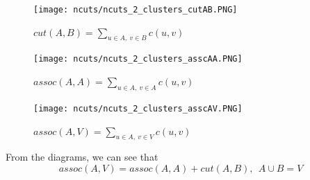 \documentclass[a4paper]{article}
\begin{document}
\begin{multicols}{3}

\begin{figure}[H]
	\centering %
	\texttt{[image: ncuts/ncuts\_2\_clusters\_cutAB.PNG]}
    \caption{$cut(A,B) = \sum\limits_{u\in A,\ v\in B}{c\left( u,v \right)}$}
\end{figure}
\columnbreak

\begin{figure}[H]
	\centering %
    	\texttt{[image: ncuts/ncuts\_2\_clusters\_asscAA.PNG]}
    \caption{$assoc(A,A)= \sum\limits_{u\in A,\ v \in A}{c(u,v)}$}
\end{figure}
\columnbreak

\begin{figure}[H]
	\centering %
    	\texttt{[image: ncuts/ncuts\_2\_clusters\_asscAV.PNG]}
    \caption{$assoc(A,V)= \sum\limits_{u\in A,\ v \in V}{c(u,v)}$}
\end{figure}
\end{multicols}
From the diagrams, we can see that
\begin{equation}
    assoc(A,V) = assoc(A,A) + cut(A,B), \ \ A\cup B = V
    \label{eq:assoc_wrt_cut}
\end{equation}
\end{document}
